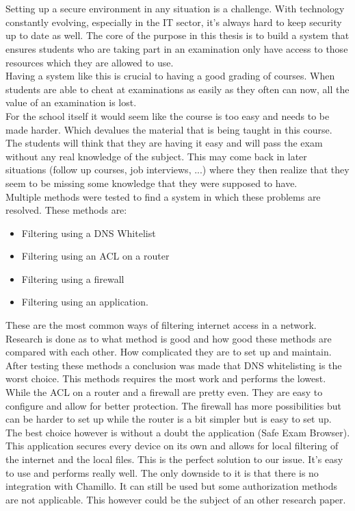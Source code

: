 
\chapter*{}
Setting up a secure environment in any situation is a challenge. With technology constantly evolving, especially in the IT sector, it's always hard to keep security up to date as well. The core of  the purpose in this thesis is to build a system that ensures students who are taking part in an examination only have access to those resources which they are allowed to use. \\ Having a system like this is crucial to having a good grading of courses. When students are able to cheat at examinations as easily as they often can now, all the value of an examination is lost.\\ For the school itself it would seem like the course is too easy and needs to be made harder. Which devalues the material that is being taught in this course.  \\
The students will think that they are having it easy and will pass the exam without any real knowledge of the subject. This may come back in later situations (follow up courses, job interviews, ...) where they then realize that they seem to be missing some knowledge that they were supposed to have.\\
Multiple methods were tested to find a system in which these problems are resolved. These methods are:
\begin{itemize}
\item Filtering using a DNS Whitelist
\item Filtering using an ACL on a router
\item Filtering using a firewall
\item Filtering using an application.
\end{itemize}
These are the most common ways of filtering internet access in a network. Research is done as to what method is good and how good these methods are compared with each other. How complicated they are to set up and maintain. After testing these methods a conclusion was made that DNS whitelisting is the worst choice. This methods requires the most work and performs the lowest. While the ACL on a router and a firewall are pretty even. They are easy to configure and allow for better protection. The firewall has more possibilities but can be harder to set up while the router is a bit simpler but is easy to set up. The best choice however is without a doubt the application (Safe Exam Browser). This application secures every device on its own and allows for local filtering of the internet and the local files. This is the perfect solution to our issue. It's easy to use and performs really well. The only downside to it is that there is no integration with Chamillo. It can still be used but some authorization methods are not applicable. This however could be the subject of an other research paper.